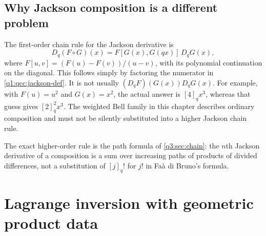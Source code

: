 \documentclass[11pt,a4paper,oneside,openany]{book}
\theoremstyle{definition}
\theoremstyle{remark}
\begin{document}
\section{Why Jackson composition is a different problem}
The first-order chain rule for the Jackson derivative is
\begin{equation}\label{q1:qcc:divided-chain}
 D_q(F\circ G)(x)=F[G(x),G(qx)]\,D_qG(x),
\end{equation}
where \(F[u,v]=(F(u)-F(v))/(u-v)\), with its polynomial continuation on the
diagonal. This follows simply by factoring the numerator in
\eqref{q1:qcc:jackson-def}. It is not usually \((D_qF)(G(x))D_qG(x)\).
For example, with \(F(u)=u^2\) and \(G(x)=x^2\), the actual answer is
\([4]_qx^3\), whereas that guess gives \([2]_q^2x^3\).
The weighted Bell family in this chapter describes ordinary composition and
must not be silently substituted into a higher Jackson chain rule.

The exact higher-order rule is the path formula of \cref{q3:sec:chain}: the
\(n\)th Jackson derivative of a composition is a sum over increasing paths of
products of divided differences, not a substitution of \([j]_q!\) for
\(j!\) in Fa\`a di Bruno's formula.


\chapter{Lagrange inversion with geometric product data}
\label{q1:qcc:lagrange}
\end{document}
